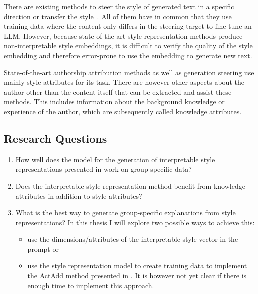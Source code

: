 There are existing methods to steer the style of generated text in a specific direction or transfer the style~\cite{zhu-etal-2024-styleflow, ijcai2020p526,konenStyleVectorsSteering2024,subramaniExtractingLatentSteering2022,turnerActivationAdditionSteering2024}. All of them have in common that they use training data where the content only differs in the steering target to fine-tune an LLM. However, because state-of-the-art style representation methods produce non-interpretable style embeddings, it is difficult to verify the quality of the style embedding and therefore error-prone to use the embedding to generate new text.

State-of-the-art authorship attribution methods as well as generation steering use mainly style attributes for its task. There are however other aspects about the author other than the content itself that can be extracted and assist these methods. This includes information about the background knowledge or experience of the author, which are subsequently called knowledge attributes.


\subsection{Research Questions}
\begin{enumerate}
  \item How well does the model for the generation of interpretable style representations presented in \citet{patelLearningInterpretableStyle2023} work on group-specific data?
  \item Does the interpretable style representation method benefit from knowledge attributes in addition to style attributes?
  \item What is the best way to generate group-specific explanations from style representations? \newline
  In this thesis I will explore two possible ways to achieve this:
  \begin{itemize}
    \item use the dimensions/attributes of the interpretable style vector in the prompt or
    \item use the style representation model to create training data to implement the ActAdd method presented in \citet{turnerActivationAdditionSteering2024}. It is however not yet clear if there is enough time to implement this approach.
  \end{itemize}
\end{enumerate}
